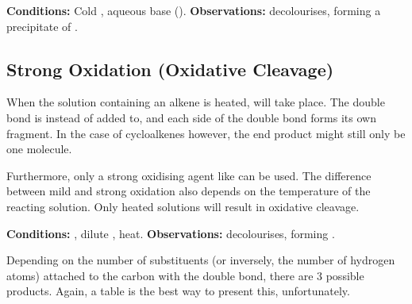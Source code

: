 		\vspace{1.5em}
		\vbox{\textbf{Conditions:}	\tabto{35mm}Cold , aqueous base ().}
		\vbox{\textbf{Observations:}  decolourises, forming
			a {} precipitate of .}





	\pagebreak
	\hypertarget{OxidativeCleavageOfAlkenes}{}
	\subsection{Strong Oxidation (Oxidative Cleavage)}

		When the  solution containing an alkene is heated,  will take place. The double bond is
		 instead of added to, and each side of the double bond forms its own fragment. In the case of cycloalkenes
		however, the end product might still only be one molecule.

		Furthermore, only a strong oxidising agent like  can be used. The difference between mild and strong oxidation also
		depends  on the temperature of the reacting solution. Only heated solutions will result in oxidative cleavage.

		\vspace{1.5em}
		\vbox{\textbf{Conditions:}	\tabto{35mm}, dilute , heat.}
		\vbox{\textbf{Observations:}  decolourises, forming .}

		\vspace{1.0em}

		Depending on the number of substituents (or inversely, the number of hydrogen atoms) attached to the carbon with the double bond,
		there are 3 possible products. Again, a table is the best way to present this, unfortunately.

